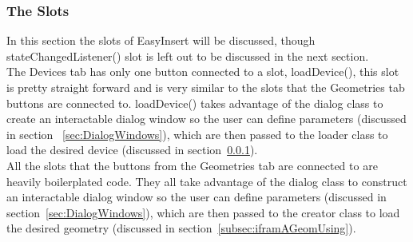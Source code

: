 %
%
%


\subsubsection{The Slots}

In this section the slots of EasyInsert will be discussed, though stateChangedListener() slot is left out to be discussed in the next section.\\

The Devices tab has only one button connected to a slot, loadDevice(), this slot is pretty straight forward and is very similar to the slots that the Geometries tab buttons are connected to. loadDevice() takes advantage of the dialog class to create an interactable dialog window so the user can define parameters (discussed in section ~\ref{sec:DialogWindows}), which are then passed to the loader class to load the desired device (discussed in section~\ref{}).\\

All the slots that the buttons from the Geometries tab are connected to are heavily boilerplated code. They all take advantage of the dialog class to construct an interactable dialog window so the user can define parameters (discussed in section~\ref{sec:DialogWindows}), which are then passed to the creator class to load the desired geometry (discussed in section~\ref{subsec:iframAGeomUsing}).\\

